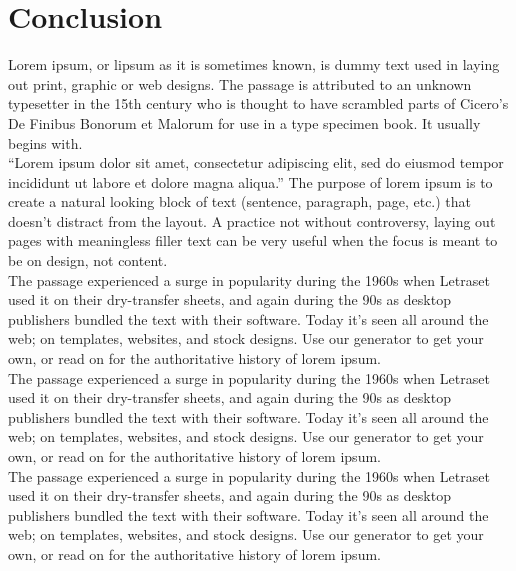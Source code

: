 \chapter*{Conclusion}
Lorem ipsum, or lipsum as it is sometimes known, is dummy text used in laying out print, graphic or web designs. The passage is attributed to an unknown typesetter in the 15th century who is thought to have scrambled parts of Cicero's De Finibus Bonorum et Malorum for use in a type specimen book. It usually begins with.\\

“Lorem ipsum dolor sit amet, consectetur adipiscing elit, sed do eiusmod tempor incididunt ut labore et dolore magna aliqua.”
The purpose of lorem ipsum is to create a natural looking block of text (sentence, paragraph, page, etc.) that doesn't distract from the layout. A practice not without controversy, laying out pages with meaningless filler text can be very useful when the focus is meant to be on design, not content.\\
The passage experienced a surge in popularity during the 1960s when Letraset used it on their dry-transfer sheets, and again during the 90s as desktop publishers bundled the text with their software. Today it's seen all around the web; on templates, websites, and stock designs. Use our generator to get your own, or read on for the authoritative history of lorem ipsum.\\


The passage experienced a surge in popularity during the 1960s when Letraset used it on their dry-transfer sheets, and again during the 90s as desktop publishers bundled the text with their software. Today it's seen all around the web; on templates, websites, and stock designs. Use our generator to get your own, or read on for the authoritative history of lorem ipsum.\\


The passage experienced a surge in popularity during the 1960s when Letraset used it on their dry-transfer sheets, and again during the 90s as desktop publishers bundled the text with their software. Today it's seen all around the web; on templates, websites, and stock designs. Use our generator to get your own, or read on for the authoritative history of lorem ipsum.


